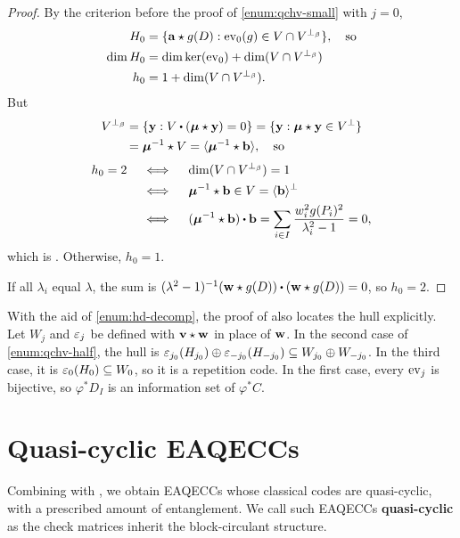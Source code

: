 \documentclass[twocolumn, 11pt]{scrartcl}
\begin{document}
\begin{proof}
    By the criterion before the proof of \ref{enum:qchv-small} with $j=0$,
    \begin{align*}
        H_0&=\{\mathbf{a}\star g(D):\operatorname{ev}_0(g)\in V\cap V^{\perp_\beta}\},\quad\text{so} \\
        \dim H_0&=\dim\ker(\operatorname{ev}_0)+\dim(V\cap V^{\perp_\beta}) \\
        h_0&=1+\dim(V\cap V^{\perp_\beta}).
    \end{align*}
    But
    \begin{align*}
        V^{\perp_\beta}&=\set{\bfy:V\dotpr(\bm\mu\star\bfy)=0}=\set{\bfy:\bm\mu\star\bfy\in V^\perp} \\
        &=\bm\mu^{-1}\star V=\ang{\bm\mu^{-1}\star\bfb},\quad\text{so}
    \end{align*}
    \begin{align*}
        h_0=2 &\qiff \dim(V\cap V^{\perp_\beta})=1 \\
        &\qiff \bm\mu^{-1}\star\bfb\in V=\ang\bfb^\perp \\
        &\qiff (\bm\mu^{-1}\star\bfb)\dotpr\bfb=\sum_{i\in I}\frac{w_i^2g(P_i)^2}{\lambda_i^2-1}=0,
    \end{align*}
    which is . Otherwise, $h_0=1$.
    
    If all $\lambda_i$ equal $\lambda$, the sum is $(\lambda^2-1)^{-1}(\bfw\star g(D))\dotpr(\bfw\star g(D))=0$, so $h_0=2$.
\end{proof}

With the aid of \ref{enum:hd-decomp}, the proof of  also locates the hull explicitly. Let $W_j$ and $\varepsilon_j$ be defined with $\mathbf{v}\star\mathbf{w}$ in place of $\mathbf{w}$. In the second case of \ref{enum:qchv-half}, the hull is $\varepsilon_{j_0}(H_{j_0})\oplus\varepsilon_{-j_0}(H_{-j_0})\subseteq W_{j_0}\oplus W_{-j_0}$. In the third case, it is $\varepsilon_0(H_0)\subseteq W_0$, so it is a repetition code. In the first case, every $\operatorname{ev}_j$ is bijective, so $\varphi^*D_I$ is an information set of $\varphi^*C$.

\section{Quasi-cyclic EAQECCs} \label{section:qc-eaqecc}

Combining  with , we obtain EAQECCs whose classical codes are quasi-cyclic, with a prescribed amount of entanglement. We call such EAQECCs \textbf{quasi-cyclic} as the check matrices inherit the block-circulant structure.
\end{document}
